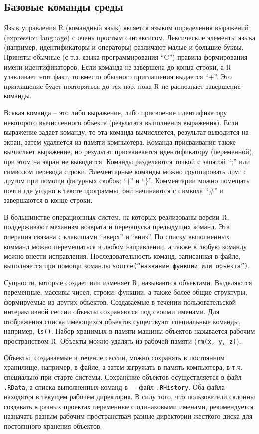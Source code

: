 \documentclass[12pt, openany, twoside]{book} %
\begin{document}
\subsection{Базовые команды среды}
Язык управления R (командный язык) является языком определения выражений (expression language) с очень простым синтаксисом. Лексические элементы языка (например, идентификаторы и операторы) различают малые и большие буквы. Приняты обычные (с т.з. языка программирования ``C'') правила формирования имени идентификаторов. Если команда не завершена до конца строки, а R улавливает этот факт, то вместо обычного приглашения выдается  ``+''. Это приглашение будет повторяться до тех пор, пока R не распознает завершение команды.

Всякая команда – это либо выражение, либо присвоение идентификатору некоторого вычисленного объекта (результата выполнения выражения). Если выражение задает команду, то эта команда вычисляется, результат выводится на экран, затем удаляется из памяти компьютера. Команда присваивания также вычисляет выражение, но результат присваивается идентификатору (переменной), при этом  на экран не выводится. Команды разделяются точкой с запятой ``;'' или символом перевода строки. Элементарные команды можно группировать друг с другом при помощи фигурных скобок: ``\{'' и ``\}''. Комментарии можно помещать почти где угодно в тексте программы, они начинаются с символа ``\#'' и завершаются в конце строки.

В большинстве операционных систем, на которых реализованы версии R, поддерживают механизм возврата и перезапуска предыдущих команд. Эта операция связана с клавишами ``вверх'' и ``вниз''. По списку выполненных комманд можно перемещаться в любом направлении, а также в любую команду можно внести исправления. Последовательность команд, записанная в файле, выполняется при помощи команды \texttt{source(``название функции или объекта'')}.

Сущности, которые создает или изменяет R, называются объектами. Выделяются переменные, массивы чисел, строки, функции, а также более общие структуры, формируемые из других объектов. Создаваемые в течении пользовательской интерактивной сессии объекты сохраняются под своими именами. Для отображения списка имеющихся объектов существуют специальные команды, например, \texttt{ls()}. Набор хранимых в памяти машины объектов называется рабочим пространством R. Объекты можно удалять из рабочей памяти (\texttt{rm(x, y, z)}).

Объекты, создаваемые в течение сессии, можно сохранять в постоянном хранилище, например, в файле, а затем загружать в память компьютера, в т.ч. специально при старте системы. Сохранение объектов осуществляется в файл \texttt{.RData}, а списка выполненных команд в --- файл \texttt{.RHistory}. Оба файла находятся в текущем рабочем директории. В силу того, что пользователи склонны создавать в разных проектах переменные с одинаковыми именами, рекомендуется назначать разным рабочим пространствам разные директории жесткого диска для постоянного хранения объектов.
\end{document}
